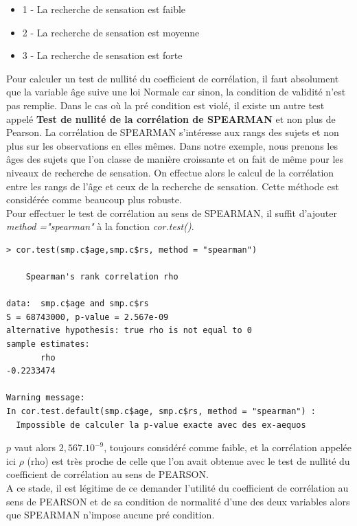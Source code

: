 \begin{itemize}
\item 1 - La recherche de sensation est faible 
\item 2 - La recherche de sensation est moyenne 
\item 3 - La recherche de sensation est forte
\end{itemize}
Pour calculer un test de nullité du coefficient de corrélation, il faut absolument que la variable âge suive une loi Normale car sinon, la condition de validité n'est pas remplie.\newline
Dans le cas où la pré condition est violé, il existe un autre test appelé \textbf{Test de nullité de la corrélation de SPEARMAN} et non plus de Pearson.\newline
La corrélation de SPEARMAN s'intéresse aux rangs des sujets et non plus sur les observations en elles mêmes. Dans notre exemple, nous prenons les âges des sujets que l'on classe de manière croissante et on fait de même pour les niveaux de recherche de sensation. On effectue alors le calcul de la corrélation entre les rangs de l'âge et ceux de la recherche de sensation. Cette méthode est considérée comme beaucoup plus robuste.\newline
\\
Pour effectuer le test de corrélation au sens de SPEARMAN, il suffit d'ajouter \textit{method ="spearman"} à la fonction \textit{cor.test()}.
\begin{lstlisting}[language=html]
> cor.test(smp.c$age,smp.c$rs, method = "spearman")

	Spearman's rank correlation rho

data:  smp.c$age and smp.c$rs
S = 68743000, p-value = 2.567e-09
alternative hypothesis: true rho is not equal to 0
sample estimates:
       rho 
-0.2233474 

Warning message:
In cor.test.default(smp.c$age, smp.c$rs, method = "spearman") :
  Impossible de calculer la p-value exacte avec des ex-aequos
\end{lstlisting}
$p$ vaut alors $2,567.10^{-9}$, toujours considéré comme faible, et la corrélation appelée ici $\rho$ (rho) est très proche de celle que l'on avait obtenue avec le test de nullité du coefficient de corrélation au sens de PEARSON.\newline
\\
A ce stade, il est légitime de ce demander l'utilité du coefficient de corrélation au sens de PEARSON et de sa condition de normalité d'une des deux variables alors que SPEARMAN n'impose aucune pré condition.\newline
